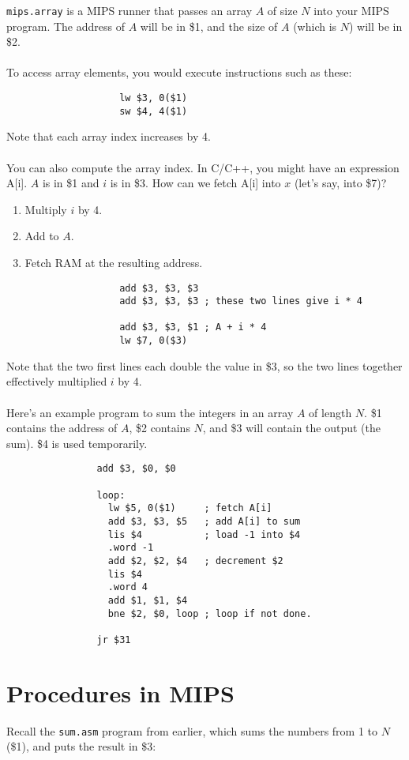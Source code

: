 \documentclass[]{article}
\theoremstyle{definition}
\newcommand{\lecture}[1]{\marginpar{{\footnotesize $\leftarrow$ \underline{#1}}}}
\begin{document}
				\verb+mips.array+ is a MIPS runner that passes an array $A$ of size $N$ into your MIPS program. The address of $A$ will be in \$1, and the size of $A$ (which is $N$) will be in \$2.
				\\ \\
				To access array elements, you would execute instructions such as these:
				\begin{verbatim}
					lw $3, 0($1)
					sw $4, 4($1)
				\end{verbatim}
				Note that each array index increases by 4.
				\\ \\
				You can also compute the array index. In C/C++, you might have an expression A[i]. $A$ is in \$1 and $i$ is in \$3. How can we fetch A[i] into $x$ (let's say, into \$7)?
				\begin{enumerate}
					\item Multiply $i$ by 4.
					\item Add to $A$.
					\item Fetch RAM at the resulting address.
				\end{enumerate}

				\begin{verbatim}
					add $3, $3, $3
					add $3, $3, $3 ; these two lines give i * 4

					add $3, $3, $1 ; A + i * 4
					lw $7, 0($3)
				\end{verbatim}

				Note that the two first lines each double the value in \$3, so the two lines together effectively multiplied $i$ by 4.
				\\ \\
				Here's an example program to sum the integers in an array $A$ of length $N$. \$1 contains the address of $A$, \$2 contains $N$, and \$3 will contain the output (the sum). \$4 is used temporarily.
				\begin{verbatim}
				add $3, $0, $0

				loop:
				  lw $5, 0($1)     ; fetch A[i]
				  add $3, $3, $5   ; add A[i] to sum
				  lis $4           ; load -1 into $4
				  .word -1
				  add $2, $2, $4   ; decrement $2
				  lis $4
				  .word 4
				  add $1, $1, $4
				  bne $2, $0, loop ; loop if not done.

				jr $31 
				\end{verbatim}

	\section{Procedures in MIPS} \lecture{January 18, 2013}
		Recall the \verb+sum.asm+ program from earlier, which sums the numbers from 1 to $N$ (\$1), and puts the result in \$3:
		
\end{document}
